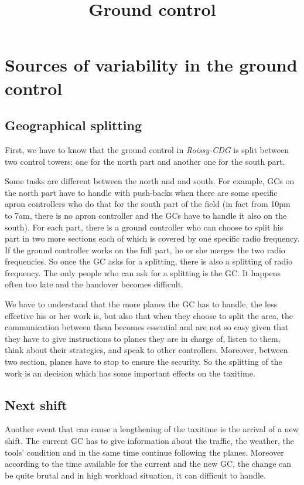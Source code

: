 \documentclass{article}
\title{Ground control}
\begin{document}
\maketitle
\section{Sources of variability in the ground control}
\subsection{Geographical splitting}
First, we have to know that the ground control in \textit{Roissy-CDG} is split between two control towers: one for the north part and another one for the south part. 

Some tasks are different between the north and and south. For example, GCs on the north part have to handle with push-backs when there are some specific apron controllers who do that for the south part of the field (in fact from 10pm to 7am, there is no apron controller and the GCs have to handle it also on the south). For each part, there is a ground controller who can choose to split his part in two more sections each of which is covered by one specific radio frequency. If the ground controller works on the full part, he or she merges the two radio frequencies. So once the GC asks for a splitting, there is also a splitting of radio frequency. The only people who can ask for a splitting is the GC. It happens often too late and the handover becomes difficult. 

We have to understand that the more planes the GC has to handle, the less effective his or her work is, but also that when they choose to split the area, the communication between them becomes essential and are not so easy given that they have to give instructions to planes they are in charge of, listen to them, think about their strategies, and speak to other controllers. Moreover, between two section, planes have to stop to ensure the security. So the splitting of the work is an decision which has some important effects on the taxitime. 

\subsection{Next shift}
Another event that can cause a lengthening of the taxitime is the arrival of a new shift. The current GC has to give information about the traffic, the weather, the tools' condition and in the same time continue following the planes. Moreover according to the time available for the current and the new GC, the change can be quite brutal and in high workload situation, it can difficult to handle. 
\end{document}
